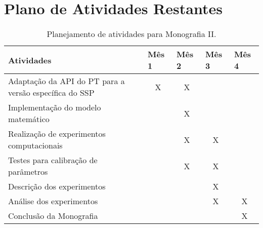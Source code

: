 \chapter{Plano de Atividades Restantes} \label{plano}


\begin{table}[H]
\label{table:planoAtividades}
\caption{Planejamento de atividades para Monografia II.}
\begin{tabular}{@{}lcccc@{}}
\toprule
Atividades                                             & \multicolumn{1}{l}{Mês 1} & \multicolumn{1}{l}{Mês 2} & \multicolumn{1}{l}{Mês 3} & \multicolumn{1}{l}{Mês 4} \\ \midrule
Adaptação da API do PT para a versão específica do SSP & X                         & X                         &                           &                           \\
Implementação do modelo matemático &                   & X                         &                           &                           \\
Realização de experimentos computacionais              &                           & X                         & X                         &                           \\
Testes para calibração de parâmetros                   &                           & X                         & X                         &                           \\
Descrição dos experimentos                             &                           &                           & X                         &                           \\
Análise dos experimentos                               &                           &                           & X                         & X                         \\
Conclusão da Monografia                                &                           &                           &                           & X                         \\ \bottomrule
\end{tabular}
\end{table}

